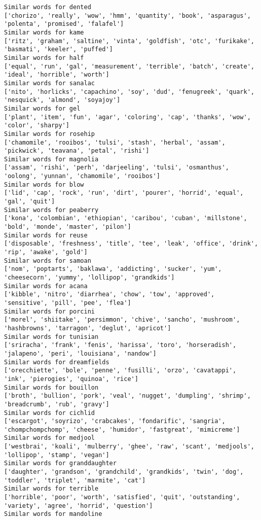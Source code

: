 \documentclass[11pt]{article}
\begin{document}
\begin{Verbatim}[commandchars=\\\{\}]
Similar words for dented
['chorizo', 'really', 'wow', 'hmm', 'quantity', 'book', 'asparagus', 'polenta', 'promised', 'falafel']
Similar words for kame
['ritz', 'graham', 'saltine', 'vinta', 'goldfish', 'otc', 'furikake', 'basmati', 'keeler', 'puffed']
Similar words for half
['equal', 'run', 'gal', 'measurement', 'terrible', 'batch', 'create', 'ideal', 'horrible', 'worth']
Similar words for sanalac
['nito', 'horlicks', 'capachino', 'soy', 'dud', 'fenugreek', 'quark', 'nesquick', 'almond', 'soyajoy']
Similar words for gel
['plant', 'item', 'fun', 'agar', 'coloring', 'cap', 'thanks', 'wow', 'color', 'sharpy']
Similar words for rosehip
['chamomile', 'rooibos', 'tulsi', 'stash', 'herbal', 'assam', 'pickwick', 'teavana', 'petal', 'rishi']
Similar words for magnolia
['assam', 'rishi', 'perh', 'darjeeling', 'tulsi', 'osmanthus', 'oolong', 'yunnan', 'chamomile', 'rooibos']
Similar words for blow
['lid', 'cap', 'rock', 'run', 'dirt', 'pourer', 'horrid', 'equal', 'gal', 'quit']
Similar words for peaberry
['kona', 'colombian', 'ethiopian', 'caribou', 'cuban', 'millstone', 'bold', 'monde', 'master', 'pilon']
Similar words for reuse
['disposable', 'freshness', 'title', 'tee', 'leak', 'office', 'drink', 'rip', 'awake', 'gold']
Similar words for samoan
['nom', 'poptarts', 'baklawa', 'addicting', 'sucker', 'yum', 'cheesecorn', 'yummy', 'lollipop', 'grandkids']
Similar words for acana
['kibble', 'nitro', 'diarrhea', 'chow', 'tow', 'approved', 'sensitive', 'pill', 'pee', 'flea']
Similar words for porcini
['morel', 'shiitake', 'persimmon', 'chive', 'sancho', 'mushroom', 'hashbrowns', 'tarragon', 'deglut', 'apricot']
Similar words for tunisian
['sriracha', 'frank', 'fenis', 'harissa', 'toro', 'horseradish', 'jalapeno', 'peri', 'louisiana', 'nandow']
Similar words for dreamfields
['orecchiette', 'bole', 'penne', 'fusilli', 'orzo', 'cavatappi', 'ink', 'pierogies', 'quinoa', 'rice']
Similar words for bouillon
['broth', 'bullion', 'pork', 'veal', 'nugget', 'dumpling', 'shrimp', 'breadcrumb', 'rub', 'gravy']
Similar words for cichlid
['escargot', 'soyrizo', 'crabcakes', 'fondarific', 'sangria', 'chompchompchomp', 'cheese', 'humidor', 'fastgreat', 'mimicreme']
Similar words for medjool
['westbrai', 'koali', 'mulberry', 'ghee', 'raw', 'scant', 'medjools', 'lollipop', 'stamp', 'vegan']
Similar words for granddaughter
['daughter', 'grandson', 'grandchild', 'grandkids', 'twin', 'dog', 'toddler', 'triplet', 'marmite', 'cat']
Similar words for terrible
['horrible', 'poor', 'worth', 'satisfied', 'quit', 'outstanding', 'variety', 'agree', 'horrid', 'question']
Similar words for mandoline

\end{Verbatim}
\end{document}
